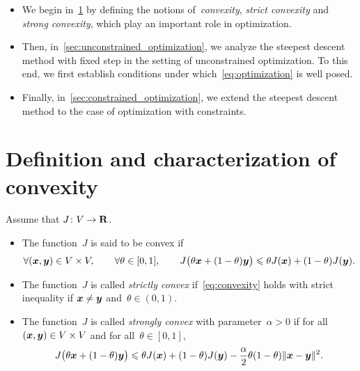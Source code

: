 \begin{itemize}
    \item
        We begin in~\cref{sec:convexity} by defining the notions of~\emph{convexity}, \emph{strict convexity} and \emph{strong convexity},
        which play an important role in optimization.

    \item
        Then, in~\cref{sec:unconstrained_optimization},
        we analyze the steepest descent method with fixed step in the setting of unconstrained optimization.
        To this end, we first establish conditions under which~\eqref{eq:optimization} is well posed.

    \item
        Finally, in~\cref{sec:constrained_optimization},
        we extend the steepest descent method to the case of optimization with constraints.
\end{itemize}


\section{Definition and characterization of convexity}
\label{sec:convexity}

\begin{definition}
    [Convexity]
    Assume that $J\colon V \to \mathbf R$.
    \begin{itemize}
        \item
            The function~$J$ is said to be convex if
            \begin{equation}
                \label{eq:convexity}
                \forall (\mathbf{\boldsymbol{x}}, \mathbf{\boldsymbol{y}}) \in V \times V,
                \qquad \forall \theta \in [0, 1],
                \qquad
                J\bigl(\theta \mathbf{\boldsymbol{x}} + (1 - \theta) \mathbf{\boldsymbol{y}}\bigr)
                \leqslant \theta J(\mathbf{\boldsymbol{x}}) + (1 - \theta) J(\mathbf{\boldsymbol{y}}).
            \end{equation}

        \item
            The function~$J$ is called \emph{strictly convex} if~\eqref{eq:convexity} holds with strict inequality
            if $\mathbf{\boldsymbol{x}} \neq \mathbf{\boldsymbol{y}}$ and~$\theta \in (0, 1)$.

        \item
            The function~$J$ is called \emph{strongly convex} with parameter~$\alpha > 0$ if
            for all $(\mathbf{\boldsymbol{x}}, \mathbf{\boldsymbol{y}}) \in V \times V$ and for all~$\theta \in [0, 1]$,
            \begin{equation}
                \label{eq:strong_convexity}
                J\bigl(\theta \mathbf{\boldsymbol{x}} + (1 - \theta) \mathbf{\boldsymbol{y}}\bigr)
                \leqslant \theta J(\mathbf{\boldsymbol{x}}) + (1 - \theta) J(\mathbf{\boldsymbol{y}})
                - \frac{\alpha}{2} \theta (1 - \theta) \lVert\mathbf{\boldsymbol{x}} - \mathbf{\boldsymbol{y}}\rVert^2.
            \end{equation}
    \end{itemize}
\end{definition}

